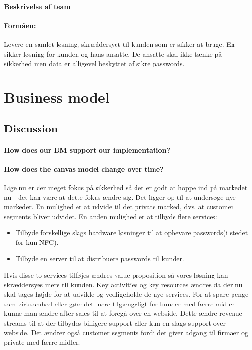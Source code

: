 \documentclass[a4paper]{article}
\begin{document}
\paragraph{Beskrivelse af team}
\paragraph{Formåen:}
Levere en samlet løsning, skræddersyet til kunden som er sikker at bruge.
En sikker løsning for kunden og hans ansatte.
De ansatte skal ikke tænke på sikkerhed men data er alligevel beskyttet af sikre passwords.

\section{Business model}

\subsection{Discussion}
\paragraph{How does our BM support our implementation?}
\paragraph{How does the canvas model change over time?}
Lige nu er der meget fokus på sikkerhed så det er godt at hoppe ind på markedet nu - det kan være at dette fokus ændre sig.
Det ligger op til at undersøge nye markeder.
En mulighed er at udvide til det private marked, dvs. at customer segments bliver udvidet.
En anden mulighed er at tilbyde flere services:
\begin{itemize}
\item Tilbyde forskellige slags hardware løsninger til at opbevare passwords(i stedet for kun NFC).
\item Tilbyde en server til at distribuere passwords til kunder.
\end{itemize}
Hvis disse to services tilføjes ændres value proposition så vores løsning kan skræddersyes mere til kunden.
Key activities og key resources ændres da der nu skal tages højde for at udvikle og vedligeholde de nye services.
For at spare penge som virksomhed eller gøre det mere tilgængeligt for kunder med færre midler kunne man ændre after sales til at foregå over en webside.
Dette ændre revenue streams til at der tilbydes billigere support eller kun en slags support over webside.
Det ændrer også customer segments fordi det giver adgang til firmaer og private med færre midler.
\end{document}
